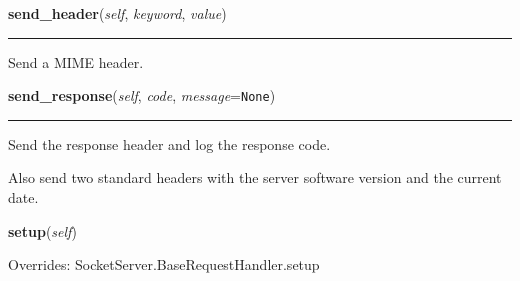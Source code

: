     \label{BaseHTTPServer:BaseHTTPRequestHandler:send_header}

    \vspace{0.5ex}

    \begin{boxedminipage}{\textwidth}

    \raggedright \textbf{send\_header}(\textit{self}, \textit{keyword}, \textit{value})

    \vspace{-1.5ex}

    \rule{\textwidth}{0.5\fboxrule}
    Send a MIME header.

    \vspace{1ex}

    \end{boxedminipage}

    \label{BaseHTTPServer:BaseHTTPRequestHandler:send_response}

    \vspace{0.5ex}

    \begin{boxedminipage}{\textwidth}

    \raggedright \textbf{send\_response}(\textit{self}, \textit{code}, \textit{message}=\texttt{None})

    \vspace{-1.5ex}

    \rule{\textwidth}{0.5\fboxrule}
    Send the response header and log the response code.

    Also send two standard headers with the server software version and the
    current date.

    \vspace{1ex}

    \end{boxedminipage}

    \vspace{0.5ex}

    \begin{boxedminipage}{\textwidth}

    \raggedright \textbf{setup}(\textit{self})

      Overrides: SocketServer.BaseRequestHandler.setup

    \end{boxedminipage}

    \label{BaseHTTPServer:BaseHTTPRequestHandler:version_string}

